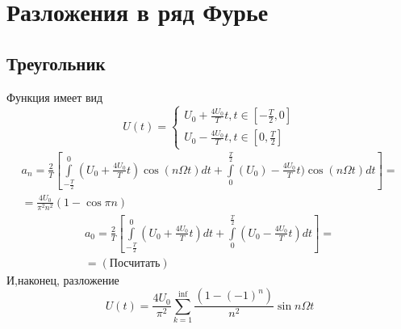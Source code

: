 
\usepackage{setspace}



\def\labauthors{Понур К.А., Сарафанов Ф.Г., Сидоров Д.А.}
\def\labgroup{420}
\def\labnumber{3000}
\def\labtheme{aqsdfghjkl;}
\renewcommand{\vec}{\mathbf}
\renewcommand{\Re}{\operatorname{Re}}
\renewcommand{\Im}{\operatorname{Im}}
\renewcommand{\phi}{\varphi}
\renewcommand{\kappa}{\varkappa}
\renewcommand{\hat}{\widehat}

\begin{spacing}{1}
\tableofcontents
\end{spacing}
\newpage
 
\section{Разложения в ряд Фурье}
\subsection{Треугольник}
Функция имеет вид 
\begin{equation}
	U(t)=\left\{
	\begin{aligned}
		U_0+\frac{4U_0}{T}t, t\in [-\frac{T}{2},0]\\
		U_0-\frac{4U_0}{T}t, t\in[0, \frac{T}{2}]
	\end{aligned}
	\right.
\end{equation}
\begin{gather}
	a_n=\frac{2}{T}\left[\int\limits^0_{-\frac{T}{2}}(U_0+\frac{4U_0}{T}t)\cos(n\Omega t)dt+\int\limits_0^{\frac{T}{2}}(U_0)-\frac{4U_0}{T}t)\cos(n\Omega t)dt \right]=\\=\frac{4U_0}{\pi^2 n^2}(1-\cos{\pi n})
\end{gather}
\begin{gather}
	a_0=\frac{2}{T}\left[\int\limits_{-\frac{T}{2}}^0 (U_0+\frac{4U_0}{T}t)dt + \int\limits_0^{\frac{T}{2}} (U_0-\frac{4U_0}{T}t)dt \right]=\\=(\text{Посчитать})
\end{gather}
И,наконец, разложение
\begin{equation}
	U(t)=\frac{4U_0}{\pi^2}\sum_{k=1}^{\inf}\frac{(1-(-1)^n)}{n^2}\sin{n\Omega t}
\end{equation}

